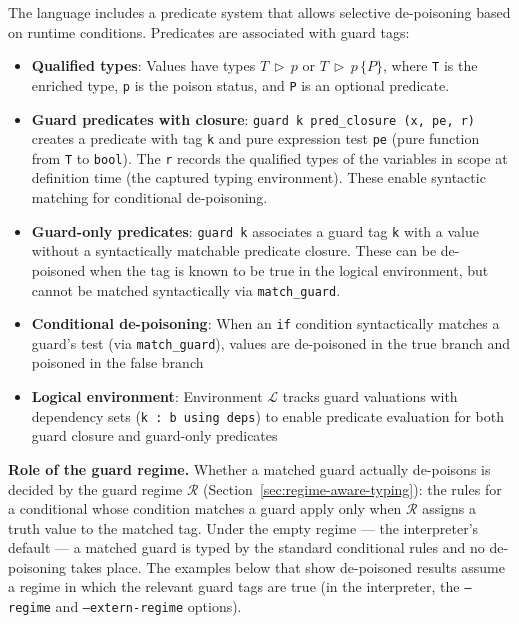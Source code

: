 \documentclass[12pt]{article}
\begin{document}
The language includes a predicate system that allows selective de-poisoning based on runtime conditions. Predicates are associated with guard tags:

\begin{itemize}
    \item \textbf{Qualified types}: Values have types $T\,\triangleright\,p$ or
    $T\,\triangleright\,p\,\{P\}$, where \texttt{T} is the enriched type,
    \texttt{p} is the poison status, and \texttt{P} is an optional predicate.
    \item \textbf{Guard predicates with closure}: \texttt{guard k pred\_closure (x, pe, r)}
    creates a predicate with tag \texttt{k} and pure expression test \texttt{pe}
    (pure function from \texttt{T} to \texttt{bool}). The \texttt{r} records
    the qualified types of the variables in scope at definition time (the
    captured typing environment). These enable
    syntactic matching for conditional de-poisoning.
    \item \textbf{Guard-only predicates}: \texttt{guard k} associates a guard tag
    \texttt{k} with a value without a syntactically matchable predicate closure.
    These can be de-poisoned when the tag is known to be true in the logical
    environment, but cannot be matched syntactically via \texttt{match\_guard}.
    \item \textbf{Conditional de-poisoning}: When an \texttt{if} condition
    syntactically matches a guard's test (via \texttt{match\_guard}), values are
    de-poisoned in the true branch and poisoned in the false branch
    \item \textbf{Logical environment}: Environment $\mathcal{L}$ tracks guard
    valuations with dependency sets (\texttt{k : b using deps}) to enable
    predicate evaluation for both guard closure and guard-only predicates
\end{itemize}

\noindent\textbf{Role of the guard regime.} Whether a matched guard actually
de-poisons is decided by the guard regime $\mathcal{R}$
(Section~\ref{sec:regime-aware-typing}): the rules for a conditional whose
condition matches a guard apply only when $\mathcal{R}$ assigns a truth value to
the matched tag. Under
the empty regime --- the interpreter's default --- a matched guard is typed by
the standard conditional rules and no de-poisoning takes place. The examples
below that show de-poisoned results assume a regime in which the relevant guard
tags are true (in the interpreter, the \texttt{--regime} and
\texttt{--extern-regime} options).
\end{document}
